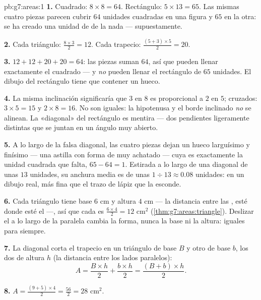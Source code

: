 \begin{solution}{pb:g7:areas:1}
\textbf{1.} Cuadrado: $8 \times 8 = 64$. Rectángulo:
$5 \times 13 = 65$. Las mismas cuatro piezas parecen cubrir $64$
unidades cuadradas en una figura y $65$ en la otra: se ha creado una unidad
de  de la nada --- supuestamente.

\textbf{2.} Cada triángulo: $\frac{8 \times 3}{2} = 12$. Cada
trapecio: $\frac{(5 + 3) \times 5}{2} = 20$.

\textbf{3.} $12 + 12 + 20 + 20 = 64$: las piezas suman $64$,
así que pueden llenar exactamente el cuadrado --- y \emph{no} pueden llenar
el rectángulo de $65$ unidades. El dibujo del rectángulo tiene que contener un
hueco.

\textbf{4.} La misma inclinación significaría que $3$ en $8$ es
proporcional a $2$ en $5$;  cruzados:
$3 \times 5 = 15$ y $2 \times 8 = 16$. No son iguales: la
hipotenusa y el borde inclinado \emph{no} se alinean. La
«diagonal» del rectángulo es mentira --- dos pendientes ligeramente
distintas que se juntan en un ángulo muy abierto.

\textbf{5.} A lo largo de la falsa diagonal, las cuatro piezas dejan un
hueco larguísimo y finísimo --- una astilla con forma de
 muy achatado --- cuya  es exactamente la unidad
cuadrada que falta, $65 - 64 = 1$. Estirada a lo largo de una diagonal de unas
$13$ unidades, su anchura media es de unas
$1 \div 13 \approx 0.08$ unidades: en un dibujo real, más fina que
el trazo de lápiz que la esconde.

\textbf{6.} Cada triángulo tiene base $6$ cm y altura $4$ cm ---
la distancia entre las , esté donde esté el  ---,
así que cada  es $\frac{6 \times 4}{2} = 12$ cm$^2$
(\cref{thm:g7:areas:triangle}). Deslizar el  a lo largo de la
paralela cambia la forma, nunca la base ni la altura:
 iguales para siempre.

\textbf{7.} La diagonal corta el trapecio en un triángulo
de base $B$ y otro de base $b$, los dos de altura $h$ (la
distancia entre los lados paralelos):
\[
A = \frac{B \times h}{2} + \frac{b \times h}{2}
= \frac{(B + b) \times h}{2} .
\]

\textbf{8.} $A = \frac{(9 + 5) \times 4}{2} = \frac{56}{2} =
28$ cm$^2$.


\end{solution}
